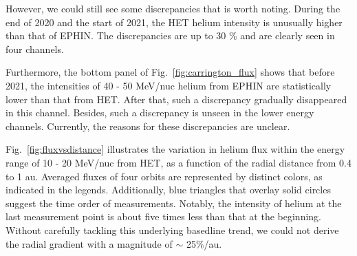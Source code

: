 However, we could still see some discrepancies that is worth noting. During the end of 2020 and the start of 2021, the \ac{HET} helium intensity is unusually higher than that of \ac{EPHIN}. The discrepancies are up to 30 \% and are clearly seen in four channels.

Furthermore, the bottom panel of Fig.~\ref{fig:carrington_flux} shows that before 2021, the intensities of 40 - 50 MeV/nuc helium from \ac{EPHIN} are statistically lower than that from \ac{HET}. After that, such a discrepancy gradually disappeared in this channel. Besides, such a discrepancy is unseen in the lower energy channels. Currently, the reasons for these discrepancies are unclear.

Fig.~\ref{fig:fluxvsdistance} illustrates the variation in helium flux within the energy range of 10 - 20 MeV/nuc from \ac{HET}, as a function of the radial distance from 0.4 to 1 au. Averaged fluxes of four orbits are represented by distinct colors, as indicated in the legends. Additionally, blue triangles that overlay solid circles suggest the time order of measurements. Notably, the intensity of helium at the last measurement point is about five times less than that at the beginning. Without carefully tackling this underlying basedline trend, we could not derive the radial gradient with a magnitude of $\sim$ 25\%/au.



